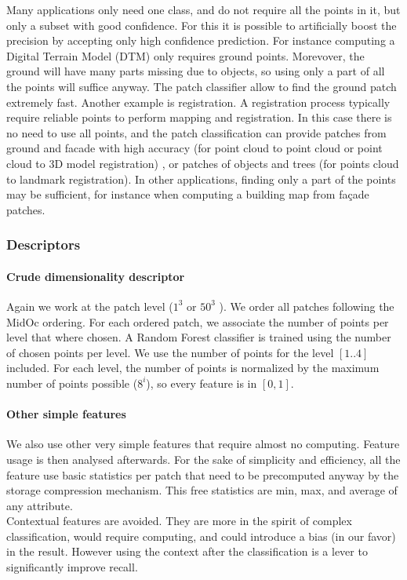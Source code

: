 				Many applications only need one class, and do not require all the points in it, but only a subset with good confidence.
				For this it is possible to artificially boost the precision by accepting only high confidence prediction.
				For instance computing a Digital Terrain Model (DTM) only requires ground points. Morevover, the ground will have many parts missing due to objects, so using only a part of all the points will suffice anyway. The patch classifier allow to find the ground patch extremely fast.
				Another example is registration. A registration process typically require reliable points to perform mapping and registration. In this case there is no need to use all points, and the patch classification can provide patches from ground and facade with high accuracy (for point cloud to point cloud or point cloud to 3D model registration) , or patches of objects and trees (for points cloud to landmark registration).
				In other applications, finding only a part of the points may be sufficient, for instance when computing a building map from façade patches.
				  
			
		\subsubsection{Descriptors}  
			\paragraph{Crude dimensionality descriptor}
				Again we work at the patch level ($1^3$ or $50^3$ \cubic \meter).
				We order all patches following the MidOc ordering. For each ordered patch, we associate the number of points per level that where chosen.
				A Random Forest classifier is trained using the number of chosen points per level.
				We use the number of points for the level $[1..4]$ included. For each level, the number of points is normalized by the maximum number of points possible ($8^i$), so every feature is in $[0,1]$.
			
			\paragraph{Other simple features}
				We also use other very simple features that require almost no computing. Feature usage is then analysed afterwards.
				For the sake of simplicity and efficiency, all the feature use basic statistics per patch that need to be precomputed anyway by the storage compression mechanism. This free statistics are min, max, and average of any attribute.
				\\
				Contextual features are avoided. They are more in the spirit of complex classification, would require computing, and could introduce a bias (in our favor) in the result.
				However using the context after the classification is a lever to significantly improve recall.
		
